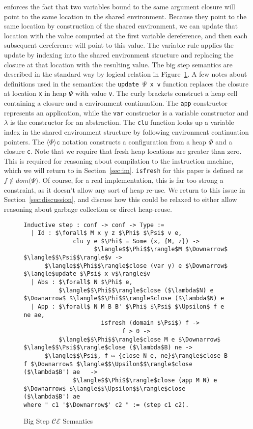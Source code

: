 enforces the fact that two variables bound to the same argument closure will
point to the same location in the shared environment. Because they point to the
same location by construction of the shared environment, we can update that
location with the value computed at the first variable dereference, and then
each subsequent dereference will point to this value. The variable rule applies
the update by indexing into the shared environment structure and replacing the
closure at that location with the resulting value. The big step semantics are
described in the standard way by logical relation in Figure~\ref{fig:bigstep}. A
few notes about definitions used in the semantics: the \texttt{update $\Psi$ x
v} function replaces the closure at location \texttt{x} in heap $\Psi$ with
value \texttt{v}. The curly brackets construct a heap cell containing a closure
and a environment continuation. The \texttt{app} constructor represents an
application, while the \texttt{var} constructor is a variable constructor and
$\lambda$ is the constructor for an abstraction. The \texttt{clu} function looks
up a variable index in the shared environment structure by following environment
continuation pointers. The $\langle \Phi \rangle \texttt{c}$ notation constructs
a configuration from a heap $\Phi$ and a closure \texttt{c}. Note that we
require that fresh heap locations are greater than zero. This is required for
reasoning about compilation to the instruction machine, which we will return to
in Section~\ref{sec:im}. \texttt{isfresh} for this paper is defined as $f \notin
dom \big( \Psi \big)$. Of course, for a real implementation, this is far too strong a
constraint, as it doesn't allow any sort of heap re-use. We return to this issue
in Section~\ref{sec:discussion}, and discuss how this could be relaxed to either
allow reasoning about garbage collection or direct heap-reuse.

\begin{figure}
\begin{lstlisting}
Inductive step : conf -> conf -> Type :=
  | Id : $\forall$ M x y z $\Phi$ $\Psi$ v e, 
              clu y e $\Phi$ = Some (x, {M, z}) -> 
                    $\langle$$\Phi$$\rangle$M $\Downarrow$ $\langle$$\Psi$$\rangle$v ->
      $\langle$$\Phi$$\rangle$close (var y) e $\Downarrow$ $\langle$update $\Psi$ x v$\rangle$v
  | Abs : $\forall$ N $\Phi$ e, 
          $\langle$$\Phi$$\rangle$close ($\lambda$N) e $\Downarrow$ $\langle$$\Phi$$\rangle$close ($\lambda$N) e
  | App : $\forall$ N M B B' $\Phi$ $\Psi$ $\Upsilon$ f e ne ae, 
                      isfresh (domain $\Psi$) f -> 
                            f > 0 ->
          $\langle$$\Phi$$\rangle$close M e $\Downarrow$ $\langle$$\Psi$$\rangle$close ($\lambda$B) ne -> 
      $\langle$$\Psi$, f ↦ {close N e, ne}$\rangle$close B f $\Downarrow$ $\langle$$\Upsilon$$\rangle$close ($\lambda$B') ae   ->
              $\langle$$\Phi$$\rangle$close (app M N) e $\Downarrow$ $\langle$$\Upsilon$$\rangle$close ($\lambda$B') ae
where " c1 '$\Downarrow$' c2 " := (step c1 c2).
\end{lstlisting}
\caption{Big Step $\mathcal{CE}$ Semantics}
\label{fig:bigstep}
\end{figure}

